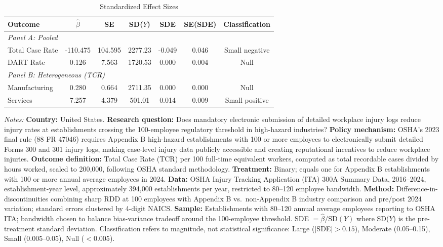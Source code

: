 \begin{table}[htbp]
\centering
\caption{Standardized Effect Sizes}
\label{tab:sde}
\begin{tabular}{lcccccc}
\toprule
Outcome & $\hat{\beta}$ & SE & SD($Y$) & SDE & SE(SDE) & Classification \\
\midrule
\multicolumn{7}{l}{\textit{Panel A: Pooled}} \\
Total Case Rate & -110.475 & 104.595 & 2277.23 & -0.049 & 0.046 & Small negative \\
DART Rate & 0.126 & 7.563 & 1720.53 & 0.000 & 0.004 & Null \\
\midrule
\multicolumn{7}{l}{\textit{Panel B: Heterogeneous (TCR)}} \\
Manufacturing & 0.280 & 0.664 & 2711.35 & 0.000 & 0.000 & Null \\
Services & 7.257 & 4.379 & 501.01 & 0.014 & 0.009 & Small positive \\
\bottomrule
\end{tabular}
\par\vspace{0.5em}\begin{flushleft}\footnotesize
\textit{Notes:} \textbf{Country:} United States. \textbf{Research question:} Does mandatory electronic submission of detailed workplace injury logs reduce injury rates at establishments crossing the 100-employee regulatory threshold in high-hazard industries? \textbf{Policy mechanism:} OSHA's 2023 final rule (88 FR 47046) requires Appendix B high-hazard establishments with 100 or more employees to electronically submit detailed Forms 300 and 301 injury logs, making case-level injury data publicly accessible and creating reputational incentives to reduce workplace injuries. \textbf{Outcome definition:} Total Case Rate (TCR) per 100 full-time equivalent workers, computed as total recordable cases divided by hours worked, scaled to 200,000, following OSHA standard methodology. \textbf{Treatment:} Binary; equals one for Appendix B establishments with 100 or more annual average employees in 2024. \textbf{Data:} OSHA Injury Tracking Application (ITA) 300A Summary Data, 2016--2024, establishment-year level, approximately 394,000 establishments per year, restricted to 80--120 employee bandwidth. \textbf{Method:} Difference-in-discontinuities combining sharp RDD at 100 employees with Appendix B vs.\ non-Appendix B industry comparison and pre/post 2024 variation; standard errors clustered by 4-digit NAICS. \textbf{Sample:} Establishments with 80--120 annual average employees reporting to OSHA ITA; bandwidth chosen to balance bias-variance tradeoff around the 100-employee threshold. SDE $= \hat{\beta} / \text{SD}(Y)$ where SD($Y$) is the pre-treatment standard deviation. Classification refers to magnitude, not statistical significance: Large ($|$SDE$| > 0.15$), Moderate (0.05--0.15), Small (0.005--0.05), Null ($< 0.005$).
\end{flushleft}
\end{table}

